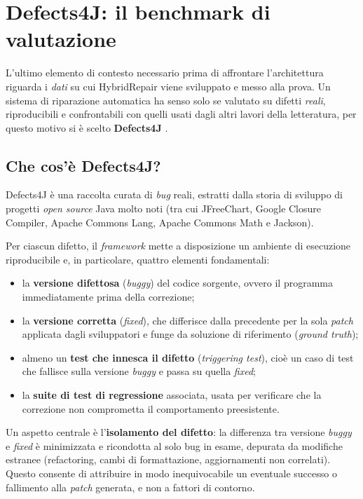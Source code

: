 \section{Defects4J: il benchmark di valutazione}
\label{sec:defects4j}

L'ultimo elemento di contesto necessario prima di affrontare l'architettura riguarda i \textit{dati}
su cui HybridRepair viene sviluppato e messo alla prova. Un sistema di riparazione automatica ha senso
solo se valutato su difetti \emph{reali}, riproducibili e confrontabili con quelli usati dagli altri
lavori della letteratura, per questo motivo si è scelto \textbf{Defects4J} \cite{just2014defects4j}.

\subsection{Che cos'è Defects4J?}

Defects4J è una raccolta curata di \textit{bug} reali, estratti dalla storia di sviluppo di progetti
\textit{open source} Java molto noti (tra cui JFreeChart, Google Closure Compiler, Apache Commons Lang,
Apache Commons Math e Jackson).

Per ciascun difetto, il \textit{framework} mette a disposizione un ambiente di esecuzione riproducibile
e, in particolare, quattro elementi fondamentali:

\begin{itemize}
    \item la \textbf{versione difettosa} (\textit{buggy}) del codice sorgente, ovvero il programma
    immediatamente prima della correzione;
    \item la \textbf{versione corretta} (\textit{fixed}), che differisce dalla precedente per la sola
    \textit{patch} applicata dagli sviluppatori e funge da soluzione di riferimento
    (\textit{ground truth});
    \item almeno un \textbf{test che innesca il difetto} (\textit{triggering test}), cioè un caso di
    test che fallisce sulla versione \textit{buggy} e passa su quella \textit{fixed};
    \item la \textbf{suite di test di regressione} associata, usata per verificare che la correzione
    non comprometta il comportamento preesistente.
\end{itemize}

Un aspetto centrale è l'\textbf{isolamento del difetto}: la differenza tra versione \textit{buggy} e
\textit{fixed} è minimizzata e ricondotta al solo bug in esame, depurata da modifiche estranee
(refactoring, cambi di formattazione, aggiornamenti non correlati). Questo consente di attribuire in
modo inequivocabile un eventuale successo o fallimento alla \textit{patch} generata, e non a fattori
di contorno.

